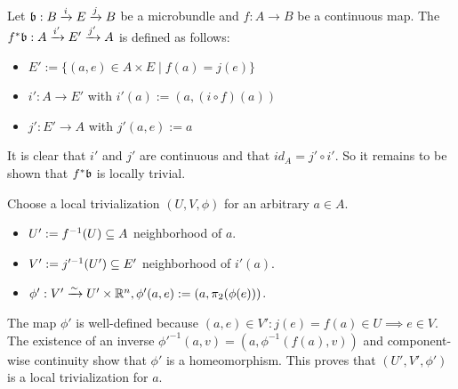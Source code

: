 \begin{mydefinition}
    Let $\bb: \bundle{B}{E}{i}{j}$ be a microbundle and $f: A \to B$ be a continuous map.
    The  $\bundledef{f^*\bb}{A}{E'}{i'}{j'}$ is defined as follows:
    \begin{itemize}
        \item $E' := \{ (a, e) \in A \times E \mid f(a) = j(e) \}$
        \item $i': A \to E'$ with $i'(a) := (a, (i \circ f)(a))$
        \item $j': E' \to A$ with $j'(a, e) := a$
    \end{itemize}
\end{mydefinition}
\begin{myproof}
    It is clear that $i'$ and $j'$ are continuous and that $id_A = j' \circ i'$.
    So it remains to be shown that $f^*\bb$ is locally trivial.

    Choose a local trivialization $(U, V, \phi)$ for an arbitrary $a \in A$.
    \begin{itemize}
        \item $U' := f^{-1}(U) \sub A$ neighborhood of $a$.
        \item $V' := j'^{-1}(U') \sub E'$ neighborhood of $i'(a)$.
        \item $\phi': V' \isomto U' \times \R^n, \phi'(a, e) := (a, \pi_2(\phi(e)))$.
    \end{itemize}
    The map $\phi'$ is well-defined because $(a, e) \in V': j(e) = f(a) \in U \implies e \in V$.
    The existence of an inverse $\phi'^{-1}(a, v) = (a, \phi^{-1}(f(a), v))$ and component-wise continuity show that $\phi'$ is a homeomorphism.
    This proves that $(U', V', \phi')$ is a local trivialization for $a$. 
\end{myproof}